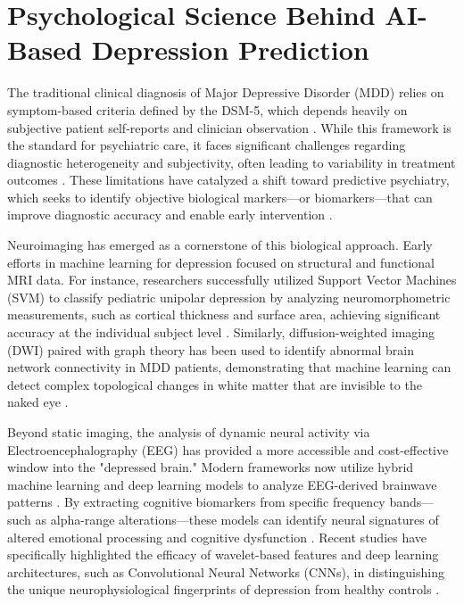 \documentclass[12pt]{article}
\begin{document}
\section{Psychological Science Behind AI-Based Depression Prediction}

The traditional clinical diagnosis of Major Depressive Disorder (MDD) relies on symptom-based criteria defined by the DSM-5, which depends heavily on subjective patient self-reports and clinician observation \citep{eder2026, ricci2025}. While this framework is the standard for psychiatric care, it faces significant challenges regarding diagnostic heterogeneity and subjectivity, often leading to variability in treatment outcomes \citep{ricci2025}. These limitations have catalyzed a shift toward predictive psychiatry, which seeks to identify objective biological markers—or biomarkers—that can improve diagnostic accuracy and enable early intervention \citep{boby2025, ricci2025}.

Neuroimaging has emerged as a cornerstone of this biological approach. Early efforts in machine learning for depression focused on structural and functional MRI data. For instance, researchers successfully utilized Support Vector Machines (SVM) to classify pediatric unipolar depression by analyzing neuromorphometric measurements, such as cortical thickness and surface area, achieving significant accuracy at the individual subject level \citep{wu2015}. Similarly, diffusion-weighted imaging (DWI) paired with graph theory has been used to identify abnormal brain network connectivity in MDD patients, demonstrating that machine learning can detect complex topological changes in white matter that are invisible to the naked eye \citep{sacchet2015}.

Beyond static imaging, the analysis of dynamic neural activity via Electroencephalography (EEG) has provided a more accessible and cost-effective window into the "depressed brain." Modern frameworks now utilize hybrid machine learning and deep learning models to analyze EEG-derived brainwave patterns \citep{ahire2025}. By extracting cognitive biomarkers from specific frequency bands—such as alpha-range alterations—these models can identify neural signatures of altered emotional processing and cognitive dysfunction \citep{ahire2025, boby2025}. Recent studies have specifically highlighted the efficacy of wavelet-based features and deep learning architectures, such as Convolutional Neural Networks (CNNs), in distinguishing the unique neurophysiological fingerprints of depression from healthy controls \citep{ahire2025}.
\end{document}
